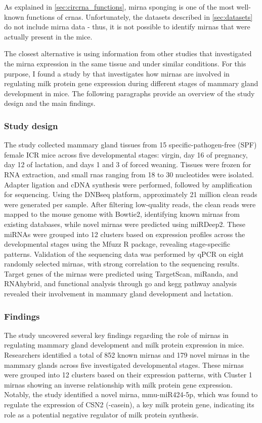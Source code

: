 As explained in \cref{sec:circrna_functions}, \gls{mirna} sponging is one of
the most well-known functions of \glspl{crna}.
Unfortunately, the datasets described in \cref{sec:datasets} do not include
\gls{mirna} data - thus, it is not possible to identify \glspl{mirna} that were
actually present in the mice.

The closest alternative is using information from other studies that
investigated the \gls{mirna} expression in the same tissue and under similar
conditions.
For this purpose, I found a study by \textcite{wang_dynamic_2022} that
investigates how \glspl{mirna} are involved in regulating milk protein gene
expression during different stages of mammary gland development in mice.
The following paragraphs provide an overview of the study design and the main
findings.

\subsubsection{Study design}
The study collected mammary gland tissues from 15 specific-pathogen-free (SPF)
female ICR mice across five developmental stages: virgin, day 16 of pregnancy,
day 12 of lactation, and days 1 and 3 of forced weaning.
Tissues were frozen for RNA extraction, and small \glspl{rna} ranging from 18
to 30 nucleotides were isolated.
Adapter ligation and cDNA synthesis were performed, followed by amplification
for sequencing.
Using the DNBseq platform, approximately 21 million clean reads were generated
per sample.
After filtering low-quality reads, the clean reads were mapped to the mouse
genome with Bowtie2, identifying known \glspl{mirna} from existing databases,
while novel \glspl{mirna} were predicted using miRDeep2.
These miRNAs were grouped into 12 clusters based on expression profiles across
the developmental stages using the Mfuzz R package, revealing stage-specific
patterns.
Validation of the sequencing data was performed by qPCR on eight randomly
selected \glspl{mirna}, with strong correlation to the sequencing results.
Target genes of the \glspl{mirna} were predicted using TargetScan, miRanda, and
RNAhybrid, and functional analysis through \gls{go} and \gls{kegg} pathway
analysis revealed their involvement in mammary gland development and
lactation\supercite{wang_dynamic_2022}.

\subsubsection{Findings}
The study uncovered several key findings regarding the role of \glspl{mirna} in
regulating mammary gland development and milk protein expression in mice.
Researchers identified a total of 852 known \glspl{mirna} and 179 novel
\glspl{mirna} in the mammary glands across five investigated developmental
stages.
These \glspl{mirna} were grouped into 12 clusters based on their expression
patterns, with Cluster 1 \glspl{mirna} showing an inverse relationship with
milk protein gene expression.
Notably, the study identified a novel \gls{mirna}, mmu-miR424-5p, which was
found to regulate the expression of CSN2 (\textbeta{}-casein), a key milk
protein gene, indicating its role as a potential negative regulator of milk
protein synthesis\supercite{wang_dynamic_2022}.


